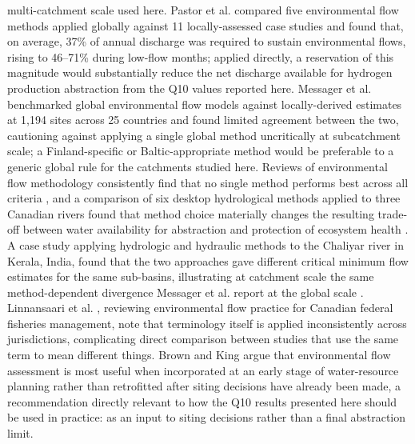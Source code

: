 \documentclass[draft]{agujournal2019}
\begin{document}
multi-catchment scale used here. Pastor et al.  compared five environmental flow methods applied globally against 11 locally-assessed case studies and found that, on average, 37\% of annual discharge was required to sustain environmental flows, rising to 46--71\% during low-flow months; applied directly, a reservation of this magnitude would substantially reduce the net discharge available for hydrogen production abstraction from the Q10 values reported here. Messager et al.  benchmarked global environmental flow models against locally-derived estimates at 1,194 sites across 25 countries and found limited agreement between the two, cautioning against applying a single global method uncritically at subcatchment scale; a Finland-specific or Baltic-appropriate method would be preferable to a generic global rule for the catchments studied here. Reviews of environmental flow methodology consistently find that no single method performs best across all criteria \cite{Gopal2013}, and a comparison of six desktop hydrological methods applied to three Canadian rivers found that method choice materially changes the resulting trade-off between water availability for abstraction and protection of ecosystem health \cite{HatfieldPaul2015}. A case study applying hydrologic and hydraulic methods to the Chaliyar river in Kerala, India, found that the two approaches gave different critical minimum flow estimates for the same sub-basins, illustrating at catchment scale the same method-dependent divergence Messager et al. report at the global scale \cite{SachinRameshThampi2023}. Linnansaari et al. , reviewing environmental flow practice for Canadian federal fisheries management, note that terminology itself is applied inconsistently across jurisdictions, complicating direct comparison between studies that use the same term to mean different things. Brown and King  argue that environmental flow assessment is most useful when incorporated at an early stage of water-resource planning rather than retrofitted after siting decisions have already been made, a recommendation directly relevant to how the Q10 results presented here should be used in practice: as an input to siting decisions rather than a final abstraction limit.
\end{document}
